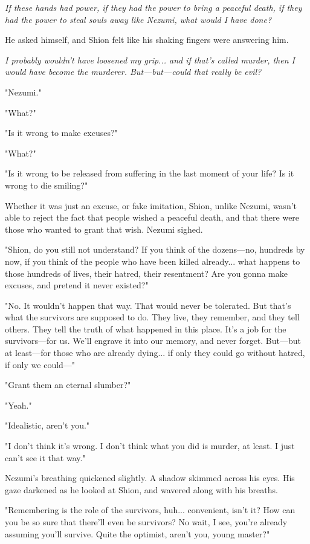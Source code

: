 \emph{If these hands had power, if they had the power to bring a peaceful
death, if they had the power to steal souls away like Nezumi, what would
I have done?}

He asked himself, and Shion felt like his shaking fingers were answering
him.

\emph{I probably wouldn't have loosened my grip... and if that's called
murder, then I would have become the murderer. But---but---could that really
be evil?}

"Nezumi."

"What?"

"Is it wrong to make excuses?"

"What?"

"Is it wrong to be released from suffering in the last moment of your
life? Is it wrong to die smiling?"

Whether it was just an excuse, or fake imitation, Shion, unlike Nezumi,
wasn't able to reject the fact that people wished a peaceful death, and
that there were those who wanted to grant that wish. Nezumi sighed.

"Shion, do you still not understand? If you think of the dozens---no,
hundreds by now, if you think of the people who have been killed
already... what happens to those hundreds of lives, their hatred, their
resentment? Are you gonna make excuses, and pretend it never existed?"

"No. It wouldn't happen that way. That would never be tolerated. But
that's what the survivors are supposed to do. They live, they remember,
and they tell others. They tell the truth of what happened in this
place. It's a job for the survivors---for us. We'll engrave it into our
memory, and never forget. But---but at least---for those who are already
dying... if only they could go without hatred, if only we could---"

"Grant them an eternal slumber?"

"Yeah."

"Idealistic, aren't you."

"I don't think it's wrong. I don't think what you did is murder, at
least. I just can't see it that way."

Nezumi's breathing quickened slightly. A shadow skimmed across his eyes.
His gaze darkened as he looked at Shion, and wavered along with his
breaths.

"Remembering is the role of the survivors, huh... convenient, isn't it?
How can you be so sure that there'll even be survivors? No wait, I see,
you're already assuming you'll survive. Quite the optimist, aren't you,
young master?"

